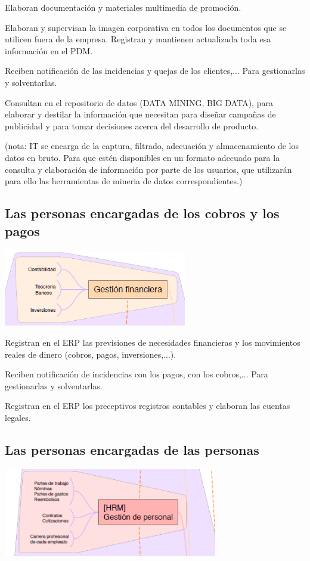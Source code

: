 \documentclass[spanish,12pt,a4paper,final,oneside]{book}
\begin{document}
Elaboran documentación y materiales multimedia de promoción. 

Elaboran y supervisan la imagen corporativa en todos los documentos que se utilicen fuera de la empresa. Registran y mantienen actualizada toda esa información en el PDM.

Reciben notificación de las incidencias y quejas de los clientes,... Para gestionarlas y solventarlas.

Consultan en el repositorio de datos (DATA MINING, BIG DATA), para elaborar y destilar la información que necesitan para diseñar campañas de publicidad y para tomar decisiones acerca del desarrollo de producto.

(nota: IT se encarga de la captura, filtrado, adecuación y almacenamiento de los datos en bruto. Para que estén disponibles en un formato adecuado para la consulta y elaboración de información por parte de los usuarios, que utilizarán para ello las herramientas de mineria de datos correspondientes.)

\subsection{Las personas encargadas de los cobros y los pagos}

\includegraphics[width=0.6\textwidth]{subesquema - finanzas02}

Registran en el ERP las previsiones de necesidades financieras y los movimientos reales de dinero (cobros, pagos, inversiones,...). 

Reciben notificación de incidencias con los pagos, con los cobros,... Para gestionarlas y solventarlas.

Registran en el ERP los preceptivos registros contables y elaboran las cuentas legales.

\subsection{Las personas encargadas de las personas}
\includegraphics[width=0.7\textwidth]{subesquema - personal01}
\end{document}
